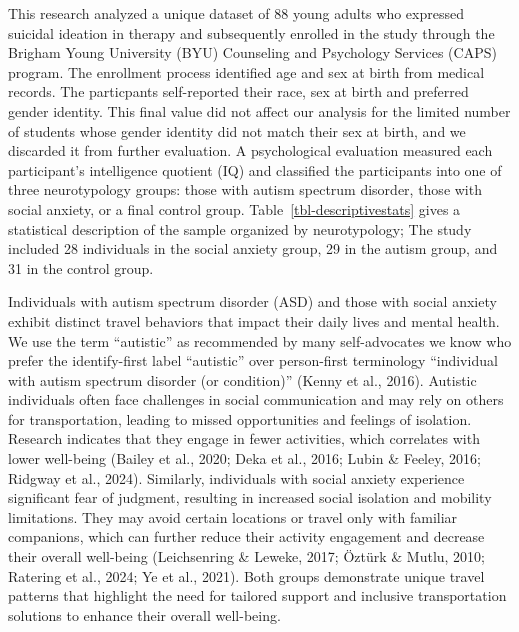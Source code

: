 \documentclass[
  letterpaper,
  number,
  review,
  3p]{elsarticle}
\begin{document}
This research analyzed a unique dataset of 88 young adults who expressed
suicidal ideation in therapy and subsequently enrolled in the study
through the Brigham Young University (BYU) Counseling and Psychology
Services (CAPS) program. The enrollment process identified age and sex
at birth from medical records. The particpants self-reported their race,
sex at birth and preferred gender identity. This final value did not
affect our analysis for the limited number of students whose gender
identity did not match their sex at birth, and we discarded it from
further evaluation. A psychological evaluation measured each
participant's intelligence quotient (IQ) and classified the participants
into one of three neurotypology groups: those with autism spectrum
disorder, those with social anxiety, or a final control group.
Table~\ref{tbl-descriptivestats} gives a statistical description of the
sample organized by neurotypology; The study included 28 individuals in
the social anxiety group, 29 in the autism group, and 31 in the control
group.

Individuals with autism spectrum disorder (ASD) and those with social
anxiety exhibit distinct travel behaviors that impact their daily lives
and mental health. We use the term ``autistic'' as recommended by many
self-advocates we know who prefer the identify-first label ``autistic''
over person-first terminology ``individual with autism spectrum disorder
(or condition)'' (Kenny et al., 2016). Autistic individuals often face
challenges in social communication and may rely on others for
transportation, leading to missed opportunities and feelings of
isolation. Research indicates that they engage in fewer activities,
which correlates with lower well-being (Bailey et al., 2020; Deka et
al., 2016; Lubin \& Feeley, 2016; Ridgway et al., 2024). Similarly,
individuals with social anxiety experience significant fear of judgment,
resulting in increased social isolation and mobility limitations. They
may avoid certain locations or travel only with familiar companions,
which can further reduce their activity engagement and decrease their
overall well-being (Leichsenring \& Leweke, 2017; Öztürk \& Mutlu, 2010;
Ratering et al., 2024; Ye et al., 2021). Both groups demonstrate unique
travel patterns that highlight the need for tailored support and
inclusive transportation solutions to enhance their overall well-being.
\end{document}
